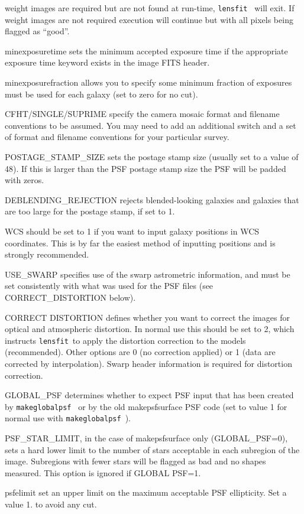\documentclass{article}
\def\lensfit{{\tt lensfit}\ }
\def\makeglobalpsf{{\tt makeglobalpsf}\ }
\begin{document}
\begin{list}{}{\itemsep=0mm \leftmargin=5mm}
weight images are required but are not found at run-time, \lensfit 
will exit. If weight images are not 
required execution will continue but with all pixels being flagged as ``good''. 
\item minexposuretime sets the minimum accepted exposure time if the appropriate exposure time keyword exists in
the image FITS header.
\item minexposurefraction allows you to specify some minimum fraction of exposures must be used 
for each galaxy (set to zero for no cut).
\item CFHT/SINGLE/SUPRIME specify the camera mosaic format and filename conventions to be assumed.
You may need to add an additional switch and a set of format and filename conventions for your particular survey. 
\item POSTAGE\_STAMP\_SIZE sets the postage stamp size (usually set to a value of 48).  If this is larger than
the PSF postage stamp size the PSF will be padded with zeros.
\item DEBLENDING\_REJECTION rejects blended-looking galaxies and galaxies that are too large for the
postage stamp, if set to 1.
\item WCS should be set to 1 if you want to input galaxy positions in WCS coordinates. This is by far 
the easiest method of inputting positions and is strongly recommended. 
\item USE\_SWARP specifies use of the swarp astrometric information, and must be set consistently with
what was used for the PSF files (see CORRECT\_DISTORTION below).
\item CORRECT DISTORTION defines whether you want to correct the images for optical and atmospheric 
distortion. In normal use this should be set to 2, which instructs \lensfit to apply the distortion
correction to the models (recommended).  Other options are 0 (no correction applied) or 1 (data are
corrected by interpolation).  Swarp header information is required for distortion correction.
\item GLOBAL\_PSF determines whether to expect PSF input that has been created by \makeglobalpsf 
or by the old makepsfsurface PSF code (set to value 1 for normal use with \makeglobalpsf).
\item PSF\_STAR\_LIMIT, in the case of makepsfsurface only (GLOBAL\_PSF=0), sets a hard lower limit to the number of stars 
acceptable in each subregion of the image. Subregions with fewer stars will be flagged as bad and no 
shapes measured. This option is ignored if GLOBAL PSF=1. 
\item psfelimit set an upper limit on the maximum acceptable PSF ellipticity.  Set a value 1. to avoid any cut.

\end{list}
\end{document}
